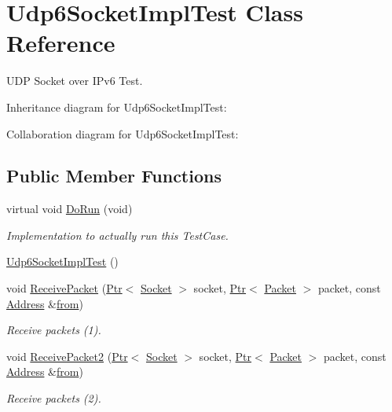 \hypertarget{classUdp6SocketImplTest}{}\section{Udp6\+Socket\+Impl\+Test Class Reference}
\label{classUdp6SocketImplTest}


U\+DP Socket over I\+Pv6 Test.  




Inheritance diagram for Udp6\+Socket\+Impl\+Test\+:


Collaboration diagram for Udp6\+Socket\+Impl\+Test\+:
\subsection*{Public Member Functions}
\begin{DoxyCompactItemize}
\item 
virtual void \hyperlink{classUdp6SocketImplTest_af467c8026f6038eb3c82745bc7de77a9}{Do\+Run} (void)
\begin{DoxyCompactList}\small\item\em Implementation to actually run this Test\+Case. \end{DoxyCompactList}\item 
\hyperlink{classUdp6SocketImplTest_a0a2bee555a31c69acd55f339e1045565}{Udp6\+Socket\+Impl\+Test} ()
\item 
void \hyperlink{classUdp6SocketImplTest_a12f789dd1f3154ac8527c8f61b85ba7b}{Receive\+Packet} (\hyperlink{classns3_1_1Ptr}{Ptr}$<$ \hyperlink{classns3_1_1Socket}{Socket} $>$ socket, \hyperlink{classns3_1_1Ptr}{Ptr}$<$ \hyperlink{classns3_1_1Packet}{Packet} $>$ packet, const \hyperlink{classns3_1_1Address}{Address} \&\hyperlink{lte__amc_8m_a1b4c81ff74eb1a626b5ade44c81004b3}{from})
\begin{DoxyCompactList}\small\item\em Receive packets (1). \end{DoxyCompactList}\item 
void \hyperlink{classUdp6SocketImplTest_ab17ab47e76ab40172a1add9d0c58023d}{Receive\+Packet2} (\hyperlink{classns3_1_1Ptr}{Ptr}$<$ \hyperlink{classns3_1_1Socket}{Socket} $>$ socket, \hyperlink{classns3_1_1Ptr}{Ptr}$<$ \hyperlink{classns3_1_1Packet}{Packet} $>$ packet, const \hyperlink{classns3_1_1Address}{Address} \&\hyperlink{lte__amc_8m_a1b4c81ff74eb1a626b5ade44c81004b3}{from})
\begin{DoxyCompactList}\small\item\em Receive packets (2). \end{DoxyCompactList}\item 

\end{DoxyCompactItemize}
